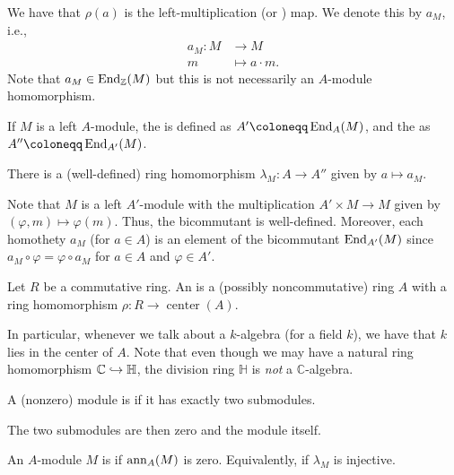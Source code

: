 \documentclass[12pt]{article}
\begin{document}
We have that $\rho(a)$ is the left-multiplication (or ) map. We denote this by $a_{M}$, i.e.,
\begin{align*} 
	a_{M} \colon M &\to M\\
	m & \mapsto a \cdot m.
\end{align*}
Note that $a_{M} \in \operatorname{End}_{\mathbb{Z}}(M)$ but this is not necessarily an $A$-module homomorphism.

\begin{defn} \label{defn:commutant-bicommutant}
	If $M$ is a left $A$-module, the  is defined as $A' \coloneqq \End_{A}(M)$, and the  as $A'' \coloneqq \End_{A'}(M)$.

	There is a (well-defined) ring homomorphism $\lambda_{M} \colon A \to A''$ given by $a \mapsto a_{M}$.
\end{defn}
Note that $M$ is a left $A'$-module with the multiplication $A' \times M \to M$ given by $(\varphi, m) \mapsto \varphi(m)$. 
Thus, the bicommutant is well-defined. 
Moreover, each homothety $a_{M}$ (for $a \in A$) is an element of the bicommutant $\operatorname{End}_{A'}(M)$ since $a_{M} \circ \varphi = \varphi \circ a_{M}$ for $a \in A$ and $\varphi \in A'$.

\begin{defn}
	Let $R$ be a commutative ring. 
	An  is a (possibly noncommutative) ring $A$ with a ring homomorphism $\rho \colon R \to \operatorname{center}(A)$.
\end{defn}
In particular, whenever we talk about a $k$-algebra (for a field $k$), we have that $k$ lies in the center of $A$. 
Note that even though we may have a natural ring homomorphism $\mathbb{C} \hookrightarrow \mathbb{H}$, 
the division ring $\mathbb{H}$ is \emph{not} a $\mathbb{C}$-algebra.

\begin{defn}
	A (nonzero) module is  if it has exactly two submodules.
\end{defn}
The two submodules are then zero and the module itself.

\begin{defn}
	An $A$-module $M$ is  if $\operatorname{ann}_{A}(M)$ is zero. 
	Equivalently, if $\lambda_{M}$ is injective.
\end{defn}
\end{document}
